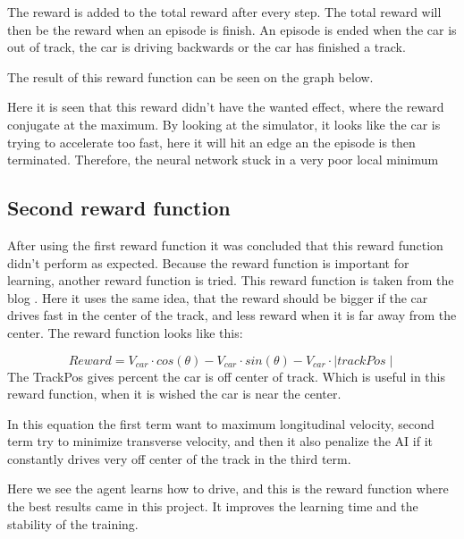 The reward is added to the total reward after every step. The total reward will then be the reward when an episode is finish. An episode is ended when the car is out of track, the car is driving backwards or the car has finished a track. 

The result of this reward function can be seen on the graph below. 

Here it is seen that this reward didn't have the wanted effect, where the reward conjugate at the maximum. By looking at the simulator, it looks like the car is trying to accelerate too fast, here it will hit an edge an the episode is then terminated. Therefore, the neural network stuck in a very poor local minimum  

\subsection{Second reward function}
After using the first reward function it was concluded that this reward function didn't perform as expected. Because the reward function is important for learning, another reward function is tried. This reward function is taken from the blog \cite{DDPG_Torcs}. Here it uses the same idea, that the reward should be bigger if the car drives fast in the center of the track, and less reward when it is far away from the center. The reward function looks like this:

\begin{equation}
Reward = V_{car} \cdot cos(\theta) - V_{car} \cdot sin(\theta) - V_{car} \cdot \mid trackPos\mid 
\end{equation}
The TrackPos gives percent the car is off center of track. Which is useful in this reward function, when it is wished the car is near the center.  

In this equation the first term want to maximum longitudinal velocity, second term try to minimize transverse velocity, and then it also penalize the AI if it constantly drives very off center of the track in the third term.

Here we see the agent learns how to drive, and this is the reward function where the best results came in this project. It improves the learning time and the stability of the training. 